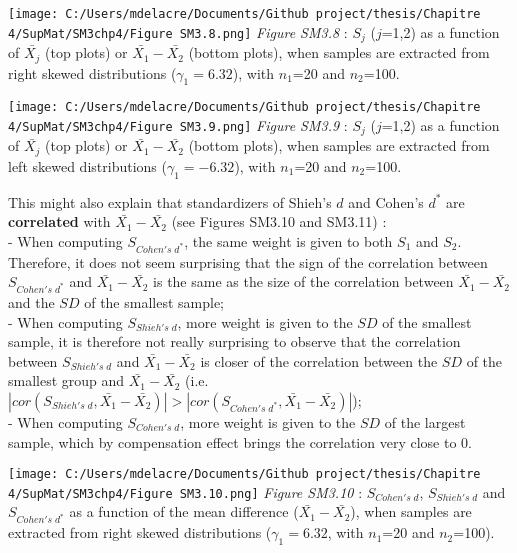 \documentclass[
  english,
  man,mask,floatsintext]{apa6}
\begin{document}
\texttt{[image: C:/Users/mdelacre/Documents/Github project/thesis/Chapitre 4/SupMat/SM3chp4/Figure SM3.8.png]}
\setlength\parindent{0pt}\emph{Figure SM3.8} : \(S_j\) (\(j\)=1,2) as a function of \(\bar{X_j}\) (top plots) or \(\bar{X_1}-\bar{X_2}\) (bottom plots), when samples are extracted from right skewed distributions (\(\gamma_1 = 6.32\)), with \(n_1\)=20 and \(n_2\)=100.

\newpage

\texttt{[image: C:/Users/mdelacre/Documents/Github project/thesis/Chapitre 4/SupMat/SM3chp4/Figure SM3.9.png]}
\emph{Figure SM3.9} : \(S_j\) (\(j\)=1,2) as a function of \(\bar{X_j}\) (top plots) or \(\bar{X_1}-\bar{X_2}\) (bottom plots), when samples are extracted from left skewed distributions (\(\gamma_1 = -6.32\)), with \(n_1\)=20 and \(n_2\)=100.

\setlength\parindent{24pt}This might also explain that standardizers of Shieh's \(d\) and Cohen's \(d^*\) are \textbf{correlated} with \(\bar{X_1}-\bar{X_2}\) (see Figures SM3.10 and SM3.11) :\\
- When computing \(S_{Cohen's \; d^*}\), the same weight is given to both \(S_1\) and \(S_2\). Therefore, it does not seem surprising that the sign of the correlation between \(S_{Cohen's \; d^*}\) and \(\bar{X_1}-\bar{X_2}\) is the same as the size of the correlation between \(\bar{X_1}-\bar{X_2}\) and the \(SD\) of the smallest sample;\\
- When computing \(S_{Shieh's \; d}\), more weight is given to the \(SD\) of the smallest sample, it is therefore not really surprising to observe that the correlation between \(S_{Shieh's \; d}\) and \(\bar{X_1}-\bar{X_2}\) is closer of the correlation between the \(SD\) of the smallest group and \(\bar{X_1}-\bar{X_2}\) (i.e.~\(|cor(S_{Shieh's \; d},\bar{X_1}-\bar{X_2})| > |cor(S_{Cohen's \; d^*},\bar{X_1}-\bar{X_2})|\));\\
- When computing \(S_{Cohen's \; d}\), more weight is given to the \(SD\) of the largest sample, which by compensation effect brings the correlation very close to 0.

\texttt{[image: C:/Users/mdelacre/Documents/Github project/thesis/Chapitre 4/SupMat/SM3chp4/Figure SM3.10.png]}
\setlength\parindent{0pt}\emph{Figure SM3.10} : \(S_{Cohen's \; d}\), \(S_{Shieh's \; d}\) and \(S_{Cohen's \; d^*}\) as a function of the mean difference (\(\bar{X_1}-\bar{X_2}\)), when samples are extracted from right skewed distributions (\(\gamma_1 = 6.32\), with \(n_1\)=20 and \(n_2\)=100).
\end{document}
